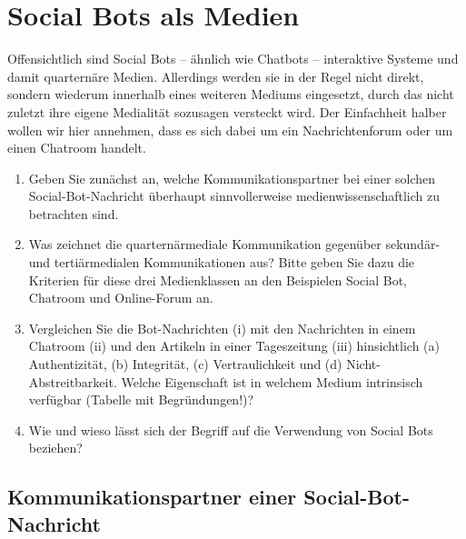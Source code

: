 \chapter{Social Bots als Medien}
\label{ch:01_social-bots-as-media}

\begin{universityTask}
    Offensichtlich sind Social Bots -- ähnlich wie Chatbots -- interaktive Systeme und damit quarternäre Medien. Allerdings werden sie in der Regel nicht direkt, sondern wiederum innerhalb eines weiteren Mediums eingesetzt, durch das nicht zuletzt ihre eigene Medialität sozusagen versteckt wird. Der Einfachheit halber wollen wir hier annehmen, dass es sich dabei um ein Nachrichtenforum oder um einen Chatroom handelt.

    \vspace{0.5cm}

    \begin{enumerate}[label=(\alph*)]
        \item Geben Sie zunächst an, welche Kommunikationspartner bei einer solchen Social-Bot-Nachricht überhaupt sinnvollerweise medienwissenschaftlich zu betrachten sind.
        \item Was zeichnet die quarternärmediale Kommunikation gegenüber sekundär- und tertiärmedialen Kommunikationen aus? Bitte geben Sie dazu die Kriterien für diese drei Medienklassen an den Beispielen Social Bot, Chatroom und Online-Forum an.
        \item Vergleichen Sie die Bot-Nachrichten (i) mit den  Nachrichten in einem Chatroom (ii) und den Artikeln in einer Tageszeitung (iii) hinsichtlich (a) Authentizität, (b) Integrität, (c) Vertraulichkeit und (d) Nicht-Abstreitbarkeit. Welche Eigenschaft ist in welchem Medium intrinsisch verfügbar (Tabelle mit Begründungen!)?
        \item Wie und wieso lässt sich der Begriff  auf die Verwendung von Social Bots beziehen?
    \end{enumerate}
\end{universityTask}

\section{Kommunikationspartner einer Social-Bot-Nachricht}
\label{sec:01-01_communication-partners-of-a-social-bot-message}

